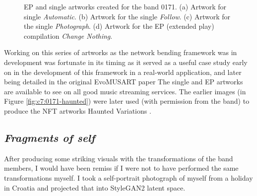 \begin{figure}[!htbp]
    \caption[0171 EP artworks]{EP and single artworks created for the band 0171. (a) Artwork for single \textit{Automatic}. (b) Artwork for the single \textit{Follow}. (c) Artwork for the single \textit{Photograph}. (d) Artwork for the EP (extended play) compilation \textit{Change Nothing}.}
    \label{fig:c7:0171-EP}
 \end{figure}

Working on this series of artworks as the network bending framework was in development was fortunate in its timing as it served as a useful case study early on in the development of this framework in a real-world application, and later being detailed in the original EvoMUSART paper \citep{broad2021network} 
The single and EP artworks are available to see on all good music streaming services.
The earlier images (in Figure \ref{fig:c7:0171-haunted}) were later used (with permission from the band) to produce the NFT artworks Haunted Variations \citep{broad2021haunted1,broad2021haunted2}. 

\subsection{\textit{Fragments of self}}
\label{c7:subsubsec:fragments}

After producing some striking visuals with the transformations of the band members, I would have been remiss if I were not to have performed the same transformations myself. 
I took a self-portrait photograph of myself from a holiday in Croatia and projected that into StyleGAN2 latent space. 


